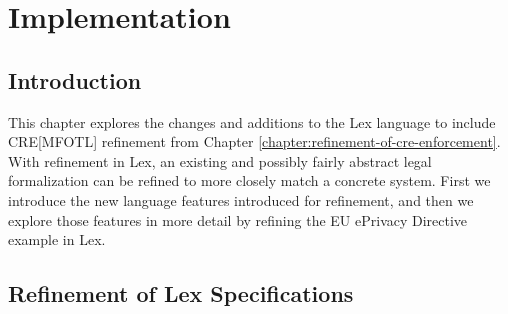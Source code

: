 \chapter{Implementation}
\label{chapter:implementation}

\section{Introduction}
\label{section:implementation-introduction}

This chapter explores the changes and additions
to the Lex language to include CRE[MFOTL]
refinement from Chapter \ref{chapter:refinement-of-cre-enforcement}.
With refinement in Lex, an existing and possibly fairly abstract
legal formalization can be refined to more closely match
a concrete system.
First we introduce the new language features introduced
for refinement, and then we explore those features in more
detail by refining the EU ePrivacy Directive example
in Lex.

\section{Refinement of Lex Specifications}
\label{section:methodology-refinement-of-lex-specifications}

